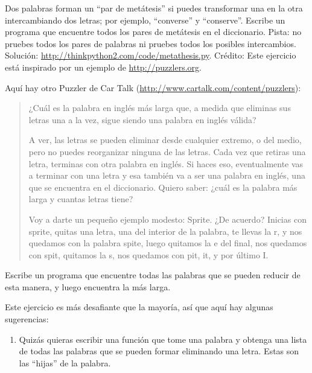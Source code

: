 \documentclass[10pt]{book}
\begin{document}
\begin{exercise}

Dos palabras forman un ``par de metátesis'' si puedes transformar una en la
otra intercambiando dos letras; por ejemplo, ``converse'' y
``conserve''.  Escribe un programa que encuentre todos los pares de metátesis
en el diccionario.  Pista: no pruebes todos los pares de palabras ni
pruebes todos los posibles intercambios.  Solución:
\url{http://thinkpython2.com/code/metathesis.py}.  Crédito: Este
ejercicio está inspirado por un ejemplo de \url{http://puzzlers.org}.

\end{exercise}


\begin{exercise}

Aquí hay otro Puzzler de Car Talk
(\url{http://www.cartalk.com/content/puzzlers}):

\begin{quote}
¿Cuál es la palabra en inglés más larga que, a medida que eliminas sus letras
una a la vez, sigue siendo una palabra en inglés válida?

A ver, las letras se pueden eliminar desde cualquier extremo, o del medio, pero
no puedes reorganizar ninguna de las letras. Cada vez que retiras una letra,
terminas con otra palabra en inglés. Si haces eso, eventualmente
vas a terminar con una letra y esa también va a ser una
palabra en inglés, una que se encuentra en el diccionario. Quiero saber:
¿cuál es la palabra más larga y cuantas letras
tiene?

Voy a darte un pequeño ejemplo modesto: Sprite. ¿De acuerdo? Inicias
con sprite, quitas una letra, una del interior de la
palabra, te llevas la r, y nos quedamos con la palabra spite, luego
quitamos la e del final, nos quedamos con spit, quitamos la s, nos
quedamos con pit, it, y por último I.
\end{quote}

Escribe un programa que encuentre todas las palabras que se pueden reducir de
esta manera, y luego encuentra la más larga.

Este ejercicio es más desafiante que la mayoría, así que aquí hay
algunas sugerencias:

\begin{enumerate}

\item Quizás quieras escribir una función que tome una palabra y
  obtenga una lista de todas las palabras que se pueden formar eliminando una
  letra.  Estas son las ``hijas'' de la palabra.


\end{enumerate}
\end{exercise}
\end{document}
